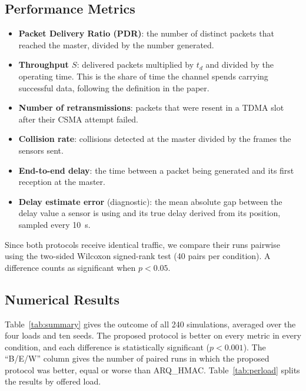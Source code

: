 \documentclass{article}
\begin{document}
\subsection{Performance Metrics}
\begin{itemize}
    \item \textbf{Packet Delivery Ratio (PDR)}: the number of distinct packets that reached the master, divided by the number generated.
    \item \textbf{Throughput $S$}: delivered packets multiplied by $t_d$ and divided by the operating time. This is the share of time the channel spends carrying successful data, following the definition in the paper.
    \item \textbf{Number of retransmissions}: packets that were resent in a TDMA slot after their CSMA attempt failed.
    \item \textbf{Collision rate}: collisions detected at the master divided by the frames the sensors sent.
    \item \textbf{End-to-end delay}: the time between a packet being generated and its first reception at the master.
    \item \textbf{Delay estimate error} (diagnostic): the mean absolute gap between the delay value a sensor is using and its true delay derived from its position, sampled every 10~s.
\end{itemize}
Since both protocols receive identical traffic, we compare their runs pairwise using the two-sided Wilcoxon signed-rank test (40 pairs per condition). A difference counts as significant when $p < 0.05$.

\subsection{Numerical Results}
Table~\ref{tab:summary} gives the outcome of all 240 simulations, averaged over the four loads and ten seeds. The proposed protocol is better on every metric in every condition, and each difference is statistically significant ($p < 0.001$). The ``B/E/W'' column gives the number of paired runs in which the proposed protocol was better, equal or worse than ARQ\_HMAC. Table~\ref{tab:perload} splits the results by offered load.
\end{document}

